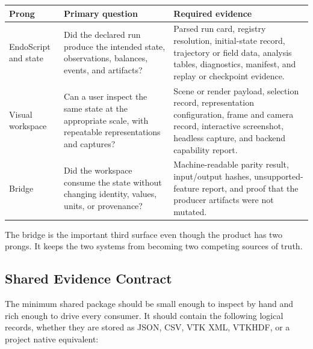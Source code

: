 \documentclass[11pt,a4paper]{article}
\begin{document}
\begin{center}
\small
\begin{tabular}{p{2.6cm}p{5.6cm}p{6.4cm}}
\toprule
\textbf{Prong} & \textbf{Primary question} & \textbf{Required evidence} \\
\midrule
EndoScript and state & Did the declared run produce the intended state,
observations, balances, events, and artifacts? & Parsed run card, registry
resolution, initial-state record, trajectory or field data, analysis tables,
diagnostics, manifest, and replay or checkpoint evidence. \\
Visual workspace & Can a user inspect the same state at the appropriate scale,
with repeatable representations and captures? & Scene or render payload,
selection record, representation configuration, frame and camera record,
interactive screenshot, headless capture, and backend capability report. \\
Bridge & Did the workspace consume the state without changing identity,
values, units, or provenance? & Machine-readable parity result, input/output
hashes, unsupported-feature report, and proof that the producer artifacts were
not mutated. \\
\bottomrule
\end{tabular}
\end{center}

The bridge is the important third surface even though the product has two
prongs.  It keeps the two systems from becoming two competing sources of
truth.

\subsection{Shared Evidence Contract}

The minimum shared package should be small enough to inspect by hand and rich
enough to drive every consumer.  It should contain the following logical
records, whether they are stored as JSON, CSV, VTK XML, VTKHDF, or a project
native equivalent:
\end{document}
